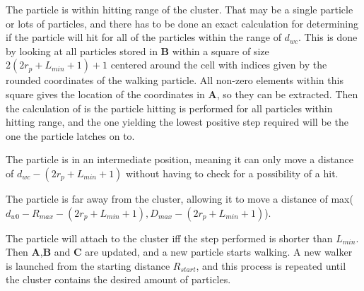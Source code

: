 \begin{itemize}
{\setlength\itemindent{1.0in}\item[$d_{wc} \le 2r_p + L_{min} + 1$:] The particle is within hitting range of the cluster. That may be a single particle or lots of particles, and there has to be done an exact calculation for determining if the particle will hit for all of the particles within the range of $d_{wc}$. This is done by looking at all particles stored in $\textbf{B}$ within a square of size $ 2(2r_p + L_{min} + 1)+1$ centered around the cell with indices given by the rounded coordinates of the walking particle. All non-zero elements within this square gives the location of the coordinates in $\textbf{A}$, so they can be extracted. Then the calculation of is the particle hitting is performed for all particles within hitting range, and the one yielding the lowest positive step required will be the one the particle latches on to. 
\item[$ 2r_p + L_{min} + 1 \le  d_{wc} \le D_{max}$:] The particle is in an intermediate position, meaning it can only move a distance of $d_{wc} - (2r_p + L_{min} + 1)$ without having to check for a possibility of a hit. 
\item[$d_{wc} = D_{max}$:] The particle is far away from the cluster, allowing it to move a distance of max($d_{w0} - R_{max} - (2r_p + L_{min} + 1), D_{max} - (2r_p + L_{min} + 1)$).}
\end{itemize}

The particle will attach to the cluster iff the step performed is shorter than $L_{min}$. Then $\textbf{A}$,$\textbf{B}$ and $\textbf{C}$ are updated, and a new particle starts walking. A new walker is launched from the starting distance $R_{start}$, and this process is repeated until the cluster contains the desired amount of particles. 

